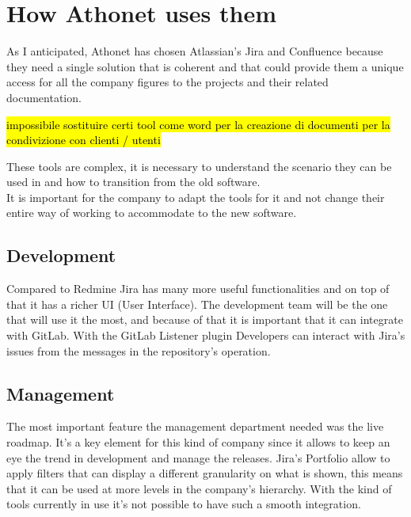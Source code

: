 \section{How Athonet uses them}
	

	As I anticipated, Athonet has chosen Atlassian's Jira and Confluence because they need a single solution that is coherent and that could provide them a unique access for all the company figures to the projects and their related documentation.
	
	\hl{impossibile sostituire certi tool come word per la creazione di documenti per la condivizione con clienti / utenti}
	
	These tools are complex, it is necessary to understand the scenario they can be used in and how to transition from the old software.\\
	It is important for the company to adapt the tools for it and not change their entire way of working to accommodate to the new software.

	\subsection{Development} 
		Compared to Redmine Jira has many more useful functionalities and on top of that it has a richer UI (User Interface).
		The development team will be the one that will use it the most, and because of that it is important that it can integrate with GitLab.
		With the GitLab Listener plugin Developers can interact with Jira's issues from the messages in the repository's operation.
	
	\subsection{Management} 
		The most important feature the management department needed was the live roadmap.	
		It's a key element for this kind of company since it allows to keep an eye the trend in development and manage the releases.
		Jira's Portfolio allow to apply filters that can display a different granularity on what is shown, this means that it can be used at more levels in the company's hierarchy.
		With the kind of tools currently in use it's not possible to have such a smooth integration.
	
